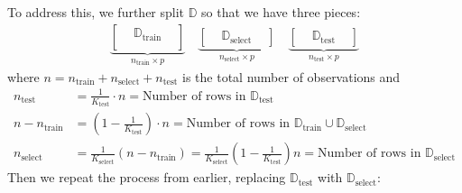 \documentclass[12pt, a4paper]{article}
\theoremstyle{definition}
\newcommand{\test}{\text{test}}
\newcommand{\train}{\text{train}}
\newcommand{\select}{\text{select}}
\newcommand{\Dtest}{\mathbb{D}_{\test}}
\newcommand{\Dtrain}{\mathbb{D}_{\train}}
\newcommand{\Dselect}{\mathbb{D}_{\select}}
\begin{document}
	To address this, we further split $\mathbb{D}$ so that we have three
	pieces:
	\begin{align*}
		\underbrace{
			\begin{bmatrix}
				{} & \mathbb{D}_{\text{train}} & {}\\
			\end{bmatrix}
		}_{n_{\text{train}}\times p}\quad
		\underbrace{
			\begin{bmatrix}
				{} & \mathbb{D}_{\text{select}} & {}
			\end{bmatrix}
		}_{n_{\text{select}}\times p}\quad
		\underbrace{
			\begin{bmatrix}
				{} & \mathbb{D}_{\text{test}} & {}
			\end{bmatrix}
		}_{n_{\text{test}}\times p}
	\end{align*}
	where $n=n_\train + n_\select + n_\test$ is the total number of observations and
	\begin{align*}
		n_\test &= \frac{1}{K_\test}\cdot n = \text{Number of rows in }\Dtest\\
		n-n_\train&=\left(1- \frac{1}{K_\test}\right)\cdot n = \text{Number of rows in }\Dtrain\cup \Dselect\\
		n_\select &= \frac{1}{K_\select}(n-n_\train) = \frac{1}{K_\select}\left(1 - \frac{1}{K_\test}\right)n=\text{Number of rows in }\Dselect
	\end{align*}
	Then we repeat the process from earlier, replacing $\Dtest$ with $\Dselect$:
\end{document}
